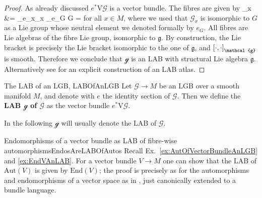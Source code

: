 \documentclass[a4paper,oneside,11pt,bibliography=totoc]{scrartcl}
\def\bas#1\eas{\begin{align*}#1\end{align*}}
\theoremstyle{plain}
\theoremstyle{remark}
\theoremstyle{definition}
\begin{document}
\begin{proof}
\leavevmode\newline
As already discussed $e^*\mathrm{V}\mathcal{G}$ is a vector bundle. The fibres are given by
\bas
\mathcal{g}_{x}
&=
_{e_x}_x
\cong
{}_{e_G} G
=
\eas
for all $x \in M$, where we used that $\mathcal{G}_x$ is isomorphic to $G$ as a Lie group whose neutral element we denoted formally by $e_G$. All fibres are Lie algebras of the fibre Lie group, isomorphic to $\mathfrak{g}$. By construction, the Lie bracket is precisely the Lie bracket isomorphic to the one of $\mathfrak{g}$, and $\mleft[ \cdot, \cdot \mright]_{\mathcal{g}}$ is smooth. Therefore we conclude that $\mathcal{g}$ is an LAB with structural Lie algebra $\mathfrak{g}$. Alternatively see \cite[\S 3.5, Ex.\ 3.5.12, page 126]{mackenzieGeneralTheory} for an explicit construction of an LAB atlas.
\end{proof}

\begin{definitions}{The LAB of an LGB, \newline\cite[\S 3.5, special situation of Def.\ 3.5.1, page 120]{mackenzieGeneralTheory}}{LABOfAnLGB}
Let $\mathcal{G} \to M$ be an LGB over a smooth manifold $M$, and denote with $e$ the identity section of $\mathcal{G}$. Then we define the \textbf{LAB $\mathcal{g}$ of $\mathcal{G}$} as the vector bundle $e^*\mathrm{V}\mathcal{G}$.
\end{definitions}

In the following $\mathcal{g}$ will usually denote the LAB of $\mathcal{G}$.

\begin{examples}{Endomorphisms of a vector bundle as LAB of fibre-wise automorphisms}{EndosAreLABOfAutos}
Recall Ex.\ \ref{ex:AutOfVectorBundleAnLGB} and \ref{ex:EndVAnLAB}. For a vector bundle $V \to M$ one can show that the LAB of $\mathrm{Aut}(V)$ is given by $\mathrm{End}(V)$; the proof is precisely as for the automorphisms and endomorphisms of a vector space as in \cite[\S 1.5.4, page 45ff.]{Hamilton}, just canonically extended to a bundle language. 
\end{examples}
\end{document}
